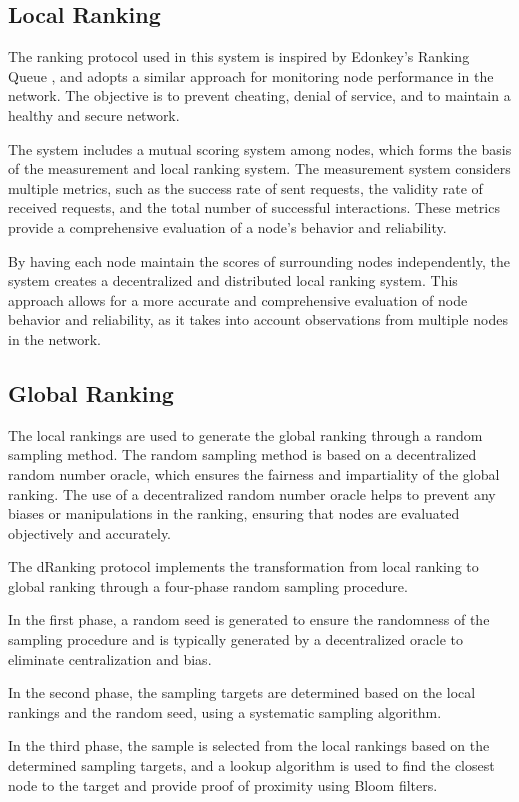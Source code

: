 \documentclass[twocolumn]{article}
\begin{document}
\subsection{Local Ranking}
The ranking protocol used in this system is inspired by Edonkey's Ranking Queue \cite{Edonkey}, and adopts a similar approach for monitoring node performance in the network. The objective is to prevent cheating, denial of service, and to maintain a healthy and secure network.

The system includes a mutual scoring system among nodes, which forms the basis of the measurement and local ranking system. The measurement system considers multiple metrics, such as the success rate of sent requests, the validity rate of received requests, and the total number of successful interactions. These metrics provide a comprehensive evaluation of a node's behavior and reliability.

By having each node maintain the scores of surrounding nodes independently, the system creates a decentralized and distributed local ranking system. This approach allows for a more accurate and comprehensive evaluation of node behavior and reliability, as it takes into account observations from multiple nodes in the network.

\subsection{Global Ranking}
The local rankings are used to generate the global ranking through a random sampling method. The random sampling method is based on a decentralized random number oracle, which ensures the fairness and impartiality of the global ranking. The use of a decentralized random number oracle helps to prevent any biases or manipulations in the ranking, ensuring that nodes are evaluated objectively and accurately.

The dRanking protocol implements the transformation from local ranking to global ranking through a four-phase random sampling procedure.

In the first phase, a random seed is generated to ensure the randomness of the sampling procedure and is typically generated by a decentralized oracle to eliminate centralization and bias.

In the second phase, the sampling targets are determined based on the local rankings and the random seed, using a systematic sampling algorithm.

In the third phase, the sample is selected from the local rankings based on the determined sampling targets, and a lookup algorithm is used to find the closest node to the target and provide proof of proximity using Bloom filters.
\end{document}
